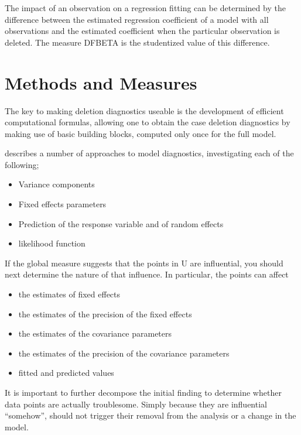 \documentclass[12pt, a4paper]{report}
\theoremstyle{plain}
\theoremstyle{definition}
\theoremstyle{remark}
\begin{document}
The impact of an observation on a regression fitting can be determined by the difference between the estimated regression coefficient of a model with all observations and the estimated coefficient when the particular observation is deleted. The measure DFBETA is the studentized value of this difference.

\section{Methods and Measures}
The key to making deletion diagnostics useable is the development of efficient computational formulas, allowing one to obtain the  case deletion diagnostics by making use of basic building blocks, computed only once for the full model.

\citet{Zewotir} describes a number of approaches to model diagnostics, investigating each of the following;
\begin{itemize}
	\item Variance components
	\item Fixed effects parameters
	\item Prediction of the response variable and of random effects
	\item likelihood function
\end{itemize}
If the global measure suggests that the points in U are influential, you should next determine the nature of
that influence. In particular, the points can affect
\begin{itemize}
	\item the estimates of fixed effects
	\item the estimates of the precision of the fixed effects
	\item the estimates of the covariance parameters
	\item the estimates of the precision of the covariance parameters
	\item fitted and predicted values
\end{itemize}

It is important to further decompose the initial finding to determine whether data points are actually troublesome. Simply because they are influential “somehow”, should not trigger their removal from the analysis or a change in the model. 
\end{document}
